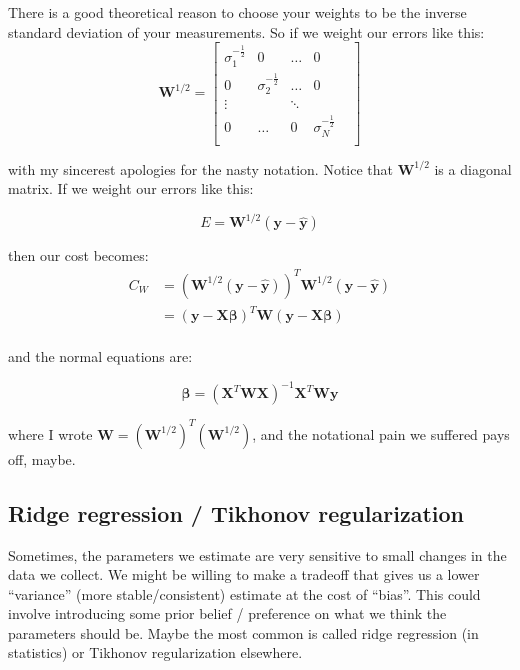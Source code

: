 \documentclass[11pt]{article}
\newcommand\xmtx{\boldsymbol{X}}
\newcommand\betavec{\boldsymbol{\beta}}
\newcommand\wmtx{\boldsymbol{W}}
\newcommand\wmtxsqrt{\wmtx^{1/2}}
\newcommand\yvec{\boldsymbol{y}}
\newcommand\yhatvec{\boldsymbol{\hat{y}}}
\begin{document}
There is a good theoretical reason to choose your weights to be the
inverse standard deviation of your measurements. 
So if we weight our errors like this:
\begin{equation}
    \wmtx^{1/2} =
    \begin{bmatrix}
        \sigma_1^{-\frac{1}{2}} & 0 & \ldots & 0 \\
        0 & \sigma_2^{-\frac{1}{2}} & \ldots & 0  \\
        \vdots & & \ddots & & \\
        0 & \ldots & 0 & \sigma_N^{-\frac{1}{2}} \\
    \end{bmatrix}
\end{equation}

with my sincerest apologies for the nasty notation.
Notice that $\wmtxsqrt$ is a diagonal matrix. If we weight our errors
like this:

\begin{equation}
        E = \wmtxsqrt( \yvec -  \yhatvec )
\end{equation}

then our cost becomes:
\begin{equation}
    \begin{aligned}
        C_W &= (\wmtxsqrt( \yvec -  \yhatvec ))^T \wmtxsqrt( \yvec - \yhatvec ) \\
          &= ( \yvec - \xmtx \betavec )^T \wmtx ( \yvec - \xmtx\betavec ) \\
    \end{aligned}
\end{equation}

and the normal equations are:

\begin{equation}
    \betavec = (\xmtx^T \wmtx \xmtx)^{-1} \xmtx^T \wmtx \yvec
\end{equation}

where I wrote $\wmtx = (\wmtxsqrt)^T(\wmtxsqrt)$, and the notational
pain we suffered pays off, maybe.

\subsection{ Ridge regression / Tikhonov regularization }

Sometimes, the parameters we estimate are very sensitive to small 
changes in the data we collect. We might be willing to make a tradeoff
that gives us a lower ``variance'' (more stable/consistent) estimate at the
cost of ``bias''. This could involve introducing some prior belief / preference
on what we think the parameters should be. Maybe the most common is
called ridge regression (in statistics) or Tikhonov regularization
elsewhere.
\end{document}
